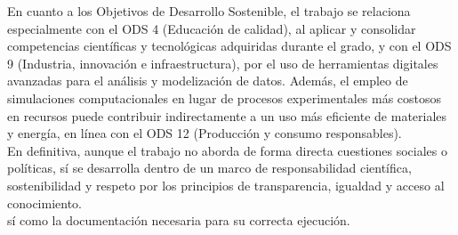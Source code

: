 \documentclass[12pt]{article}
\numberwithin{equation}{section}%
\begin{document}
En cuanto a los Objetivos de Desarrollo Sostenible, el trabajo se relaciona especialmente con el ODS 4 (Educación de calidad), al aplicar y consolidar competencias científicas y tecnológicas adquiridas durante el grado, y con el ODS 9 (Industria, innovación e infraestructura), por el uso de herramientas digitales avanzadas para el análisis y modelización de datos. Además, el empleo de simulaciones computacionales en lugar de procesos experimentales más costosos en recursos puede contribuir indirectamente a un uso más eficiente de materiales y energía, en línea con el ODS 12 (Producción y consumo responsables).\\

En definitiva, aunque el trabajo no aborda de forma directa cuestiones sociales o políticas, sí se desarrolla dentro de un marco de responsabilidad científica, sostenibilidad y respeto por los principios de transparencia, igualdad y acceso al conocimiento.\\
sí como la documentación necesaria para su correcta ejecución.

\newpage

\printbibliography
\end{document}
